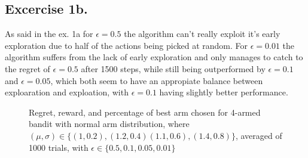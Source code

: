 \documentclass[12pt, a4paper,DIV=12, bibliography=totocnumbered]{scrartcl}
\begin{document}
\subsection{Excercise 1b.}
As said in the ex. 1a for $\epsilon=0.5$ the algorithm can't really exploit it's early exploration due to half of the actions being picked at random.
For $\epsilon=0.01$ the algorithm suffers from the lack of early exploration and only manages to catch to the regret of $\epsilon=0.5$ after 1500 steps,
while still being outperformed by $\epsilon=0.1$ and $\epsilon=0.05$, which both seem to have an appropiate balance between exploaration and exploation, with $\epsilon=0.1$
having slightly better performance.
\begin{figure}[h]
\hfill
{}\par
{}
\caption{Regret, reward, and percentage of best arm chosen for 
    4-armed bandit with normal arm distribution, where $(\mu,\sigma)\in\{(1,0.2),(1.2,0.4)(1.1,0.6),(1.4,0.8)\}$, averaged of 1000 trials, with $\epsilon \in \{0.5,0.1,0.05,0.01\}$}
\end{figure}
\end{document}
